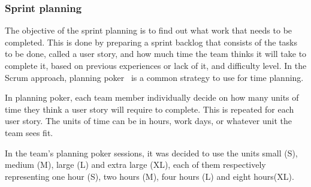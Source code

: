 \begin{comment}

The assignment at hand will demand innovation and most likely result in frequent changes throughout the entire duration of the project.

What the team needs is to follow the guidelines of an agile development framework. First and foremost it must also be a development framework that is known to the team, so that a minimum of time will be spent trying to learn a new process. The standard and obvious choice is to follow the Scrum model. All the members of the team have previous experience with Scrum from the course IT1901.

The Scrum model is an iterative and incremental agile software development framework. The main principle is that a small team is to focus on reaching a common goal.

The Scrum process consists of iterations of sprints that has a duration one to four weeks. Each sprint has three important parts.
The first part is the planning meeting~\ref{sec:sprintplanning}, then begins the daily  meetings~\ref{sec:dailymeeting}, and finally, the process is concluded with an end meeting~\ref{sec:endmeeting}.

In this section, the concept behind the Scrum process will be thoroughly explained. The team's project process will be reviewed in detail in chapter~\ref{sec:sprints}.
\end{comment}

\subsubsection{Sprint planning}
\label{sec:sprintplanning}
The objective of the sprint planning is to find out what work that needs to be
completed. This is done by preparing a sprint backlog that consists of the tasks
to be done, called a user story, and how much time the team thinks it will take to complete it, based on previous experiences or lack of it, and difficulty level. In the Scrum approach, planning poker~\cite{planningpoker} is a common strategy to use for time planning.

In planning poker, each team member individually decide on how many units of
time they think a user story will require to complete. This is repeated for each
user story. The units of time can be in hours, work days, or whatever unit the team sees fit.

In the team's planning poker sessions, it was decided to use the units small (S), medium (M), large (L) and extra
large (XL), each of them respectively representing one hour (S), two hours (M), four hours (L) and eight hours(XL).

